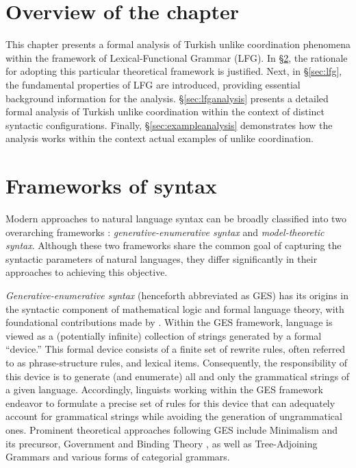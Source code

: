 \section{Overview of the chapter}

This chapter presents a formal analysis of Turkish unlike coordination phenomena within the framework of Lexical-Functional Grammar (LFG). In \S\ref{sec:frameworksofsyntax}, the rationale for adopting this particular theoretical framework is justified. Next, in \S\ref{sec:lfg}, the fundamental properties of LFG are introduced, providing essential background information for the analysis. \S\ref{sec:lfganalysis} presents a detailed formal analysis of Turkish unlike coordination within the context of distinct syntactic configurations. Finally, \S\ref{sec:exampleanalysis} demonstrates how the analysis works within the context actual examples of unlike coordination.

\section{Frameworks of syntax}\label{sec:frameworksofsyntax} 

Modern approaches to natural language syntax can be broadly classified into two overarching frameworks \citep{pullumetal_2001}: \textit{generative-enumerative syntax} and \textit{model-theoretic syntax}. Although these two frameworks share the common goal of capturing the syntactic parameters of natural languages, they differ significantly in their approaches to achieving this objective.

\textit{Generative-enumerative syntax} (henceforth abbreviated as GES) has its origins in the syntactic component of mathematical logic and formal language theory, with foundational contributions made by \citet{Chomsky1959}. Within the GES framework, language is viewed as a (potentially infinite) collection of strings generated by a formal ``device.'' This formal device consists of a finite set of rewrite rules, often referred to as phrase-structure rules, and lexical items. Consequently, the responsibility of this device is to generate (and enumerate) all and only the grammatical strings of a given language. Accordingly, linguists working within the GES framework endeavor to formulate a precise set of rules for this device that can adequately account for grammatical strings while avoiding the generation of ungrammatical ones. Prominent theoretical approaches following GES include Minimalism \citep{Chomsky1993} and its precursor, Government and Binding Theory \citep{Chomsky1981}, as well as Tree-Adjoining Grammars \citep{Joshi1987} and various forms of categorial grammars.

